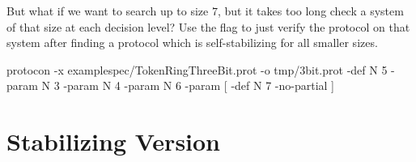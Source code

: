 But what if we want to search up to size $7$, but it takes too long check a system of that size at each decision level?
Use the  flag to just verify the protocol on that system after finding a protocol which is self-stabilizing for all smaller sizes.
\begin{code}
protocon -x examplespec/TokenRingThreeBit.prot -o tmp/3bit.prot -def N 5 -param N 3 -param N 4 -param N 6 -param [ -def N 7 -no-partial ]
\end{code}

\section{Stabilizing Version}




